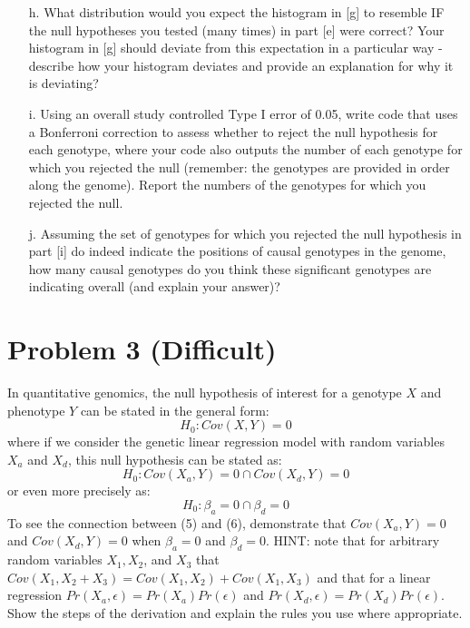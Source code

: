\documentclass[letterpaper, 11pt]{article}
\begin{document}
\begin{itemize}
\item[h.] What distribution would you expect the histogram in [g] to resemble IF the null hypotheses you tested (many times) in part [e] were correct?  Your histogram in [g] should deviate from this expectation in a particular way - describe how your histogram deviates and provide an explanation for why it is deviating?

\item[i.] Using an overall study controlled Type I error of 0.05, write code that uses a Bonferroni correction to assess whether to reject the null hypothesis for each genotype, where your code also outputs the number of each genotype for which you rejected the null (remember: the genotypes are provided in order along the genome).  Report the numbers of the genotypes for which you rejected the null.

\item[j.] Assuming the set of genotypes for which you rejected the null hypothesis in part [i] do indeed indicate the positions of causal genotypes in the genome, how many causal genotypes do you think these significant genotypes are indicating overall (and explain your answer)? 

\end{itemize}

\section*{Problem 3 (Difficult)}

In quantitative genomics, the null hypothesis of interest for a genotype $X$ and phenotype $Y$ can be stated in the general form:
\begin{equation}
H_0: Cov(X,Y) = 0
\end{equation}
where if we consider the genetic linear regression model with random variables $X_a$ and $X_d$, this null hypothesis can be stated as:
\begin{equation}
H_0: Cov(X_a,Y) = 0 \cap Cov(X_d,Y) = 0
\end{equation}
or even more precisely as: 
\begin{equation}
H_0: \beta_a = 0 \cap \beta_d = 0
\end{equation}
To see the connection between (5) and (6), demonstrate that $Cov(X_a, Y) = 0$ and $Cov(X_d, Y) = 0$ when $\beta_a=0$ and $\beta_d = 0$.  HINT: note that for arbitrary random variables $X_1, X_2$, and $X_3$ that $Cov(X_1, X_2 + X_3) = Cov(X_1, X_2) + Cov(X_1, X_3)$ and that for a linear regression $Pr(X_a, \epsilon) = Pr(X_a) Pr(\epsilon)$ and $Pr(X_d, \epsilon) = Pr(X_d) Pr(\epsilon)$.  Show the steps of the derivation and explain the rules you use where appropriate.
\end{document}
